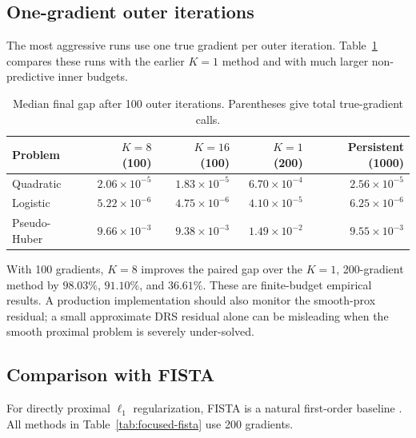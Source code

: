 \documentclass[10pt,leqno]{amsart}
\numberwithin{equation}{section}
\numberwithin{algorithm}{section}
\theoremstyle{remark}
\begin{document}
\subsection{One-gradient outer iterations}

The most aggressive runs use one true gradient per outer iteration.  Table~\ref{tab:focused-one-gradient} compares these runs with the earlier $K=1$ method and with much larger non-predictive inner budgets.

\begin{table}[t]
\centering
\caption{Median final gap after 100 outer iterations.  Parentheses give total true-gradient calls.}
\label{tab:focused-one-gradient}
\scriptsize
\begin{tabular}{@{}lrrrr@{}}
\toprule
Problem & $K=8$ (100) & $K=16$ (100) & $K=1$ (200) & Persistent (1000)\\
\midrule
Quadratic & $2.06\!\times\!10^{-5}$ & $1.83\!\times\!10^{-5}$ & $6.70\!\times\!10^{-4}$ & $2.56\!\times\!10^{-5}$\\
Logistic & $5.22\!\times\!10^{-6}$ & $4.75\!\times\!10^{-6}$ & $4.10\!\times\!10^{-5}$ & $6.25\!\times\!10^{-6}$\\
Pseudo-Huber & $9.66\!\times\!10^{-3}$ & $9.38\!\times\!10^{-3}$ & $1.49\!\times\!10^{-2}$ & $9.55\!\times\!10^{-3}$\\
\bottomrule
\end{tabular}
\end{table}

With 100 gradients, $K=8$ improves the paired gap over the $K=1$, 200-gradient method by $98.03\%$, $91.10\%$, and $36.61\%$.  These are finite-budget empirical results.  A production implementation should also monitor the smooth-prox residual; a small approximate DRS residual alone can be misleading when the smooth proximal problem is severely under-solved.

\subsection{Comparison with FISTA}

For directly proximal $\ell_1$ regularization, FISTA is a natural first-order baseline \cite{BeckTeboulle2009}.  All methods in Table~\ref{tab:focused-fista} use 200 gradients.
\end{document}
